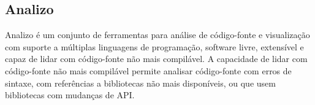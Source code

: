 

%
%

\subsection{Analizo} \label{analizo}

Analizo é um conjunto de ferramentas para análise de código-fonte e
visualização com suporte a múltiplas linguagens de programação, software livre,
extensível e capaz de lidar com código-fonte não mais compilável. A capacidade
de lidar com código-fonte não mais compilável permite analisar código-fonte
com erros de sintaxe, com referências a bibliotecas não mais disponíveis, ou
que usem bibliotecas com mudanças de API.


